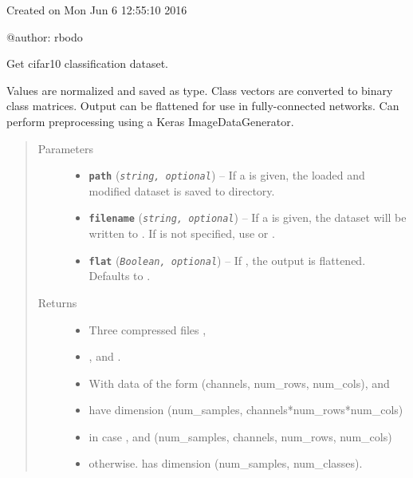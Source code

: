 \documentclass[letterpaper,10pt,english]{sphinxmanual}
\begin{document}
Created on Mon Jun  6 12:55:10 2016

@author: rbodo

\begin{fulllineitems}
\label{snntoolbox.io_utils:snntoolbox.io_utils.cifar10_load.get_cifar10}
Get cifar10 classification dataset.

Values are normalized and saved as  type. Class vectors are
converted to binary class matrices. Output can be flattened for use in
fully-connected networks. Can perform preprocessing using a Keras
ImageDataGenerator.
\begin{quote}\begin{description}
\item[{Parameters}] \leavevmode\begin{itemize}
\item {} 
\textbf{\texttt{path}} (\emph{\texttt{string, optional}}) -- If a  is given, the loaded and modified dataset is saved to
 directory.

\item {} 
\textbf{\texttt{filename}} (\emph{\texttt{string, optional}}) -- If a  is given, the dataset will be written to .
If  is not specified, use  or .

\item {} 
\textbf{\texttt{flat}} (\emph{\texttt{Boolean, optional}}) -- If , the output is flattened. Defaults to .

\end{itemize}

\item[{Returns}] \leavevmode
\begin{itemize}
\item {} 
Three compressed files ,

\item {} 
, and .

\item {} 
With data of the form (channels, num\_rows, num\_cols),  and

\item {} 
 have dimension (num\_samples, channels*num\_rows*num\_cols)

\item {} 
in case , and (num\_samples, channels, num\_rows, num\_cols)

\item {} 
otherwise.  has dimension (num\_samples, num\_classes).

\end{itemize}


\end{description}\end{quote}

\end{fulllineitems}
\end{document}
